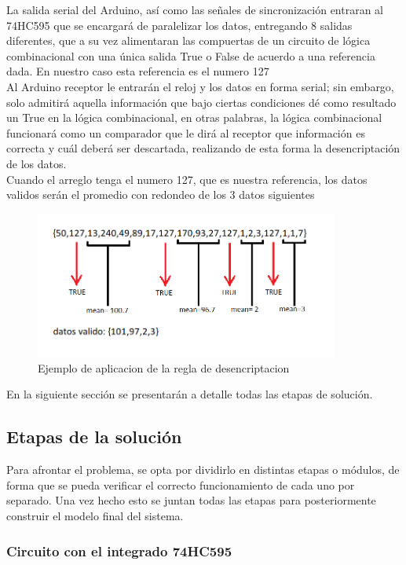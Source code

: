 \documentclass{article}
\begin{document}
La salida serial del Arduino, así como las señales de sincronización entraran al 74HC595 que se encargará de paralelizar los datos, entregando 8 salidas diferentes, que a su vez alimentaran las compuertas de un circuito de lógica combinacional con una única salida True o False de acuerdo a una referencia dada. En nuestro caso esta referencia es el numero 127\\

Al Arduino receptor le entrarán el reloj y los datos en forma serial; sin embargo, solo admitirá aquella información que bajo ciertas condiciones dé como resultado un True en la lógica combinacional, en otras palabras, la lógica combinacional funcionará como un comparador que le dirá al receptor que información es correcta y cuál deberá ser descartada, realizando de esta forma la desencriptación de los datos.\\

Cuando el arreglo tenga el numero 127, que es nuestra referencia, los datos validos serán el promedio con redondeo de los 3 datos siguientes\\
\begin{figure}[!ht]
\includegraphics[width=10cm]{reglas.png}
\centering
\caption{Ejemplo de aplicacion de la regla de desencriptacion}
\end{figure}
En la siguiente sección se presentarán a detalle todas las etapas de solución.
\vspace{2cm}
\subsection{Etapas de la solución}

Para afrontar el problema, se opta por dividirlo en distintas etapas o módulos, de forma que se pueda verificar el correcto funcionamiento de cada uno por separado. Una vez hecho esto se juntan todas las etapas para posteriormente construir el modelo final del sistema.\\
\subsubsection{Circuito con el integrado 74HC595}
\end{document}
